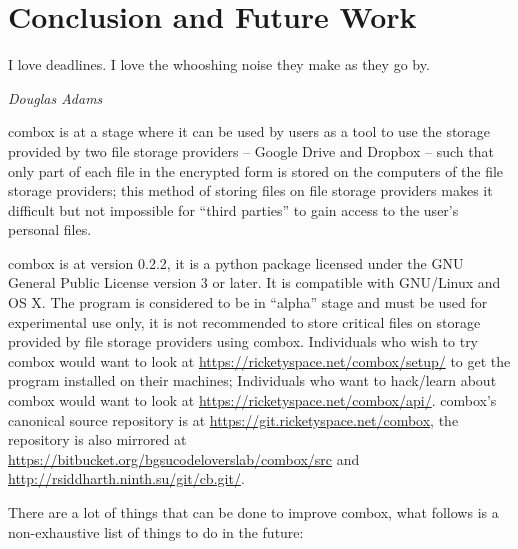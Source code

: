\chapter{Conclusion and Future Work}\label{ch:5}

\epigraph{I love deadlines. I love the whooshing noise they make as
  they go by.}{\textit{Douglas Adams}}

combox is at a stage where it can be used by users as a tool to use
the storage provided by two file storage providers -- Google Drive and
Dropbox -- such that only part of each file in the encrypted form is
stored on the computers of the file storage providers; this method of
storing files on file storage providers makes it difficult but not
impossible for ``third parties'' to gain access to the user's personal
files.

combox is at version 0.2.2, it is a python package licensed under the
GNU General Public License version 3 or later. It is compatible with
GNU/Linux and OS X. The program is considered to be in ``alpha'' stage
and must be used for experimental use only, it is not recommended to
store critical files on storage provided by file storage providers
using combox. Individuals who wish to try combox would want to look at
\url{https://ricketyspace.net/combox/setup/} to get the program
installed on their machines; Individuals who want to hack/learn about
combox would want to look at
\url{https://ricketyspace.net/combox/api/}. combox's canonical source
repository is at \url{https://git.ricketyspace.net/combox}, the
repository is also mirrored at
\url{https://bitbucket.org/bgsucodeloverslab/combox/src} and
\url{http://rsiddharth.ninth.su/git/cb.git/}.

There are a lot of things that can be done to improve combox, what
follows is a non-exhaustive list of things to do in the future:

